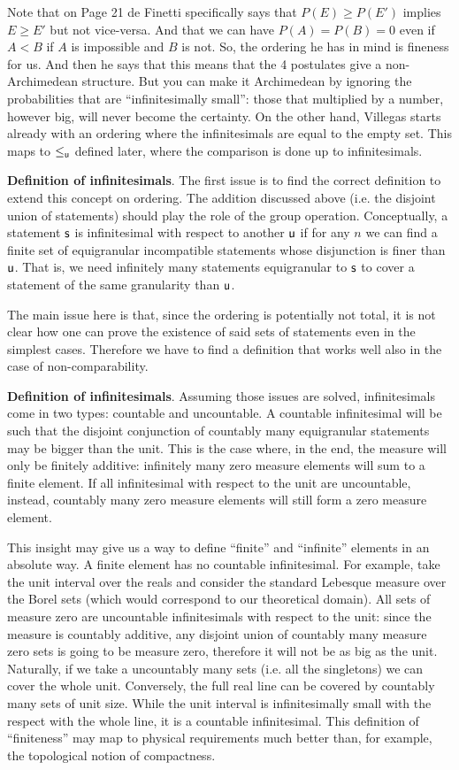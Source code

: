 \documentclass[10pt, onecolumn, longbibliography, nofootinbib]{revtex4-2}
\begin{document}
Note that on Page 21 de Finetti\cite{definetti} specifically says that $P(E) \geq P(E')$ implies $E \geq E'$ but not vice-versa. And that we can have $P(A)=P(B)=0$ even if $A<B$ if $A$ is impossible and $B$ is not. So, the ordering he has in mind is fineness for us. And then he says that this means that the 4 postulates give a non-Archimedean structure. But you can make it Archimedean by ignoring the probabilities that are ``infinitesimally small'': those that multiplied by a number, however big, will never become the certainty. On the other hand, Villegas\cite{villegas} starts already with an ordering where the infinitesimals are equal to the empty set. This maps to $\lequ$ defined later, where the comparison is done up to infinitesimals.

\textbf{Definition of infinitesimals}. The first issue is to find the correct definition to extend this concept on ordering. The addition discussed above (i.e. the disjoint union of statements) should play the role of the group operation. Conceptually, a statement $\stmt$ is infinitesimal with respect to another $\stmt[u]$ if for any $n$ we can find a finite set of equigranular incompatible statements whose disjunction is finer than $\stmt[u]$. That is, we need infinitely many statements equigranular to $\stmt$ to cover a statement of the same granularity than $\stmt[u]$.

The main issue here is that, since the ordering is potentially not total, it is not clear how one can prove the existence of said sets of statements even in the simplest cases. Therefore we have to find a definition that works well also in the case of non-comparability.

\textbf{Definition of infinitesimals}. Assuming those issues are solved, infinitesimals come in two types: countable and uncountable. A countable infinitesimal will be such that the disjoint conjunction of countably many equigranular statements may be bigger than the unit. This is the case where, in the end, the measure will only be finitely additive: infinitely many zero measure elements will sum to a finite element. If all infinitesimal with respect to the unit are uncountable, instead, countably many zero measure elements will still form a zero measure element.

This insight may give us a way to define ``finite'' and ``infinite'' elements in an absolute way. A finite element has no countable infinitesimal. For example, take the unit interval over the reals and consider the standard Lebesque measure over the Borel sets (which would correspond to our theoretical domain). All sets of measure zero are uncountable infinitesimals with respect to the unit: since the measure is countably additive, any disjoint union of countably many measure zero sets is going to be measure zero, therefore it will not be as big as the unit. Naturally, if we take a uncountably many sets (i.e. all the singletons) we can cover the whole unit. Conversely, the full real line can be covered by countably many sets of unit size. While the unit interval is infinitesimally small with the respect with the whole line, it is a countable infinitesimal. This definition of ``finiteness'' may map to physical requirements much better than, for example, the topological notion of compactness.
\end{document}
